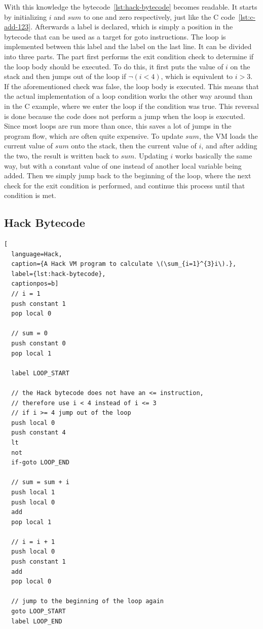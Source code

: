 With this knowledge the bytecode~\ref{lst:hack-bytecode} becomes readable. It starts by initializing \(i\) and \(sum\) to one and zero respectively, just like the C code~\ref{lst:c-add-123}. Afterwards a label is declared, which is simply a position in the bytecode that can be used as a target for goto instructions.
The loop is implemented between this label and the label on the last line.
It can be divided into three parts. The part first performs the exit condition check to determine if the loop body should be executed. To do this, it first puts the value of \(i\) on the stack and then jumps out of the loop if \(\neg(i < 4)\), which is equivalent to \(i > 3\). If the aforementioned check was false, the loop body is executed.
This means that the actual implementation of a loop condition works the other way around than in the C example, where we enter the loop if the condition was true. This reversal is done because the code does not perform a jump when the loop is executed. Since most loops are run more than once, this saves a lot of jumps in the program flow, which are often quite expensive.
To update \(sum\), the VM loads the current value of \(sum\) onto the stack, then the current value of \(i\), and after adding the two, the result is written back to \(sum\).
Updating \(i\) works basically the same way, but with a constant value of one instead of another local variable being added.
Then we simply jump back to the beginning of the loop, where the next check for the exit condition is performed, and continue this process until that condition is met.

\subsection{Hack Bytecode} \label{hack-bytecode}
\begin{lstlisting}[
  language=Hack,
  caption={A Hack VM program to calculate \(\sum_{i=1}^{3}i\).},
  label={lst:hack-bytecode},
  captionpos=b]
  // i = 1
  push constant 1
  pop local 0

  // sum = 0
  push constant 0
  pop local 1

  label LOOP_START

  // the Hack bytecode does not have an <= instruction,
  // therefore use i < 4 instead of i <= 3
  // if i >= 4 jump out of the loop
  push local 0
  push constant 4
  lt
  not
  if-goto LOOP_END

  // sum = sum + i
  push local 1
  push local 0
  add
  pop local 1

  // i = i + 1
  push local 0
  push constant 1
  add
  pop local 0

  // jump to the beginning of the loop again
  goto LOOP_START
  label LOOP_END
\end{lstlisting}
